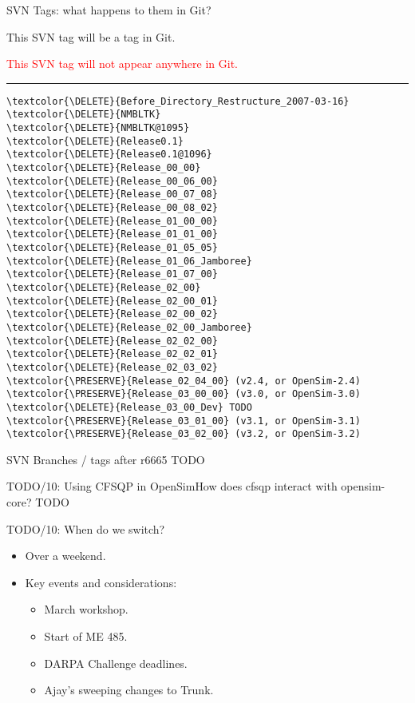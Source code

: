 \documentclass[pdf, 8pt]{beamer}
\def\NUMDECISIONS{10}
\def\DELETE{red}
\def\PRESERVE{green!60!black}
\begin{document}
\begin{frame}[fragile]{SVN Tags: what happens to them in Git?}

\textcolor{\PRESERVE}{This SVN tag will be a tag in Git.}

\textcolor{\DELETE}{This SVN tag will not appear anywhere in Git.}

\hrule

\begin{multicols}{2}
\begin{Verbatim}
\textcolor{\DELETE}{Before_Directory_Restructure_2007-03-16}
\textcolor{\DELETE}{NMBLTK}
\textcolor{\DELETE}{NMBLTK@1095}
\textcolor{\DELETE}{Release0.1}
\textcolor{\DELETE}{Release0.1@1096}
\textcolor{\DELETE}{Release_00_00}
\textcolor{\DELETE}{Release_00_06_00}
\textcolor{\DELETE}{Release_00_07_08}
\textcolor{\DELETE}{Release_00_08_02}
\textcolor{\DELETE}{Release_01_00_00}
\textcolor{\DELETE}{Release_01_01_00}
\textcolor{\DELETE}{Release_01_05_05}
\textcolor{\DELETE}{Release_01_06_Jamboree}
\textcolor{\DELETE}{Release_01_07_00}
\textcolor{\DELETE}{Release_02_00}
\textcolor{\DELETE}{Release_02_00_01}
\textcolor{\DELETE}{Release_02_00_02}
\textcolor{\DELETE}{Release_02_00_Jamboree}
\textcolor{\DELETE}{Release_02_02_00}
\textcolor{\DELETE}{Release_02_02_01}
\textcolor{\DELETE}{Release_02_03_02}
\textcolor{\PRESERVE}{Release_02_04_00} (v2.4, or OpenSim-2.4)
\textcolor{\PRESERVE}{Release_03_00_00} (v3.0, or OpenSim-3.0)
\textcolor{\DELETE}{Release_03_00_Dev} TODO
\textcolor{\PRESERVE}{Release_03_01_00} (v3.1, or OpenSim-3.1)
\textcolor{\PRESERVE}{Release_03_02_00} (v3.2, or OpenSim-3.2)
\end{Verbatim}
\end{multicols}
\end{frame}

\begin{frame}{SVN Branches / tags after r6665}
TODO
\end{frame}

\begin{frame}{TODO/\NUMDECISIONS: Using CFSQP in OpenSim}{How does cfsqp
    interact with opensim-core?}
TODO
\end{frame}

\begin{frame}{TODO/\NUMDECISIONS: When do we switch?}

\begin{itemize}
\item Over a weekend.
\item Key events and considerations:
\begin{itemize}
\item March workshop.
\item Start of ME 485.
\item DARPA Challenge deadlines.
\item Ajay's sweeping changes to Trunk.
\end{itemize}
\end{itemize}

\end{frame}
\end{document}
